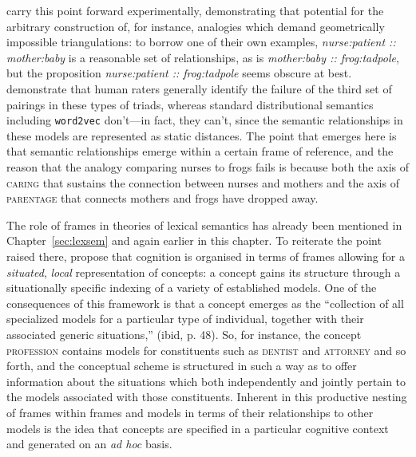 \cite{ChenEA2017} carry this point forward experimentally, demonstrating that potential for the arbitrary construction of, for instance, analogies which demand geometrically impossible triangulations: to borrow one of their own examples, \emph{nurse:patient :: mother:baby} is a reasonable set of relationships, as is \emph{mother:baby :: frog:tadpole}, but the proposition \emph{nurse:patient :: frog:tadpole} seems obscure at best.  \citeauthor{ChenEA2017} demonstrate that human raters generally identify the failure of the third set of pairings in these types of triads, whereas standard distributional semantics including \texttt{word2vec} don't---in fact, they can't, since the semantic relationships in these models are represented as static distances.  The point that emerges here is that semantic relationships emerge within a certain frame of reference, and the reason that the analogy comparing nurses to frogs fails is because both the axis of \textsc{caring} that sustains the connection between nurses and mothers and the axis of \textsc{parentage} that connects mothers and frogs have dropped away.

The role of frames in theories of lexical semantics has already been mentioned in Chapter~\ref{sec:lexsem} and again earlier in this chapter.  To reiterate the point raised there, \cite{BarsalouEA1993} propose that cognition is organised in terms of frames allowing for a \emph{situated}, \emph{local} representation of concepts: a concept gains its structure through a situationally specific indexing of a variety of established models.  One of the consequences of this framework is that a concept emerges as the ``collection of all specialized models for a particular type of individual, together with their associated generic situations,'' (ibid, p. 48).  So, for instance, the concept \textsc{profession} contains models for constituents such as \textsc{dentist} and \textsc{attorney} and so forth, and the conceptual scheme is structured in such a way as to offer information about the situations which both independently and jointly pertain to the models associated with those constituents.  Inherent in this productive nesting of frames within frames and models in terms of their relationships to other models is the idea that concepts are specified in a particular cognitive context and generated on an \emph{ad hoc} basis.


